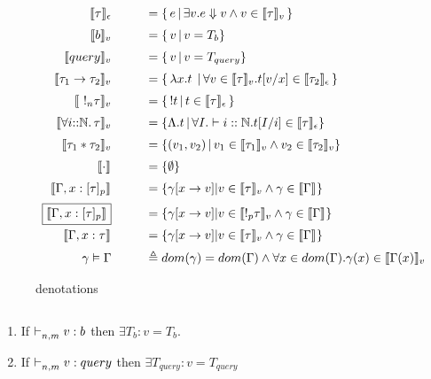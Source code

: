 \begin{figure*}[h]
$$
\begin{array}{rcl}
      \llbracket {\tau} \rrbracket_{\epsilon}  &\quad &  = \{ \, e \, | \, \exists v. e \Downarrow v \land v \in   \llbracket {\tau} \rrbracket_{v} \,  \}  \\[2mm]
      \llbracket {b} \rrbracket_{v} &\quad &  = \{ \,  v  \, | \, v = T_b \}  \\[2mm]
      \llbracket {query} \rrbracket_{v} &\quad &  = \{ \,  v \, |  \, v = T_{query} \}  \\[2mm]
      \llbracket {\tau_1 \rightarrow \tau_2} \rrbracket_{v} & \quad & = \{\, \mathrel { \lambda {x} . {t} } \, | \, \forall v \in\llbracket {\tau} \rrbracket_{v}. t[v/x] \in \llbracket {\tau_2} \rrbracket_{\epsilon} \, \} \\[2mm]
      \llbracket { \ !_n \tau} \rrbracket_{v} & \quad & = \{\, !t \, | \, t \in \llbracket {\tau} \rrbracket_{\epsilon} \, \} \\[2mm]
      \llbracket {\forall i{::}\mathbb{N}.\,{\tau}} \rrbracket_{v}  & \quad & = \{  \Lambda. t \, | \, \forall I. \vdash i :: \mathbb{N}. t[I/i] \in \llbracket {\tau} \rrbracket_{\epsilon}   \}  \\[2mm]
      \llbracket {\tau_1 * \tau_2} \rrbracket_{v}  & \quad & = \{  (v_1, v_2) \, | \, v_1 \in \llbracket {\tau_1} \rrbracket_{v} \land v_2 \in \llbracket {\tau_2} \rrbracket_{v}     \} \\[2mm]
      \llbracket {\cdot} \rrbracket_{} &\quad & = \{ \emptyset \} \\[2mm]
      \llbracket {\Gamma, x : [\tau]_p} \rrbracket_{} & \quad & = \{ \gamma[x \rightarrow v] | v \in \llbracket {\tau} \rrbracket_{v} \land \gamma \in \llbracket {\Gamma} \rrbracket_{}   \}  \\ [2mm]
      \boxed{\llbracket {\Gamma, x : [\tau]_p} \rrbracket_{}}  & \quad & = \{ \gamma[x \rightarrow v] | v \in \llbracket {!_p \tau} \rrbracket_{v}  \land \gamma \in \llbracket {\Gamma} \rrbracket_{}   \}  \\ [2mm]
      \llbracket {\Gamma, x : \tau} \rrbracket_{} & \quad & = \{ \gamma[x \rightarrow v] | v \in \llbracket {\tau} \rrbracket_{v} \land \gamma \in \llbracket {\Gamma} \rrbracket_{}   \}  \\ [2mm]
      \gamma \vDash \Gamma &\quad & \triangleq dom(\gamma) = dom(\Gamma) \land \forall x \in dom(\Gamma). \gamma(x) \in \llbracket {\Gamma(x)} \rrbracket_{v}
\end{array}
$$
\caption{denotations}
\end{figure*}


\clearpage
\begin{lem} $ $
	\label{lem:1}
    \begin{enumerate}
\item If $\mathrel{\vdash_{n,m}^{} {v} : {b}} $ then $ \exists T_{b} : v = T_{b}$.\\
\item If $\mathrel{\vdash_{n,m}^{} {v} : {query}} $ then $ \exists T_{query} : v = T_{query}$
\end{enumerate}
	
	
\end{lem}

